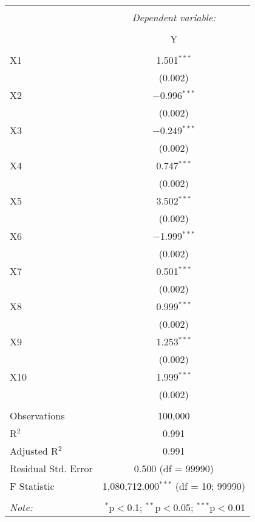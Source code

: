 \documentclass{article}
\begin{document}
\begin{table}[!htbp] \centering
  \caption{}
  \label{}
\begin{tabular}{@{\extracolsep{5pt}}lc}
\\[-1.8ex]\hline
\hline \\[-1.8ex]
 & \multicolumn{1}{c}{\textit{Dependent variable:}} \\
\cline{2-2}
\\[-1.8ex] & Y \\
\hline \\[-1.8ex]
 X1 & 1.501$^{***}$ \\
  & (0.002) \\
 X2 & $-$0.996$^{***}$ \\
  & (0.002) \\
 X3 & $-$0.249$^{***}$ \\
  & (0.002) \\
 X4 & 0.747$^{***}$ \\
  & (0.002) \\
 X5 & 3.502$^{***}$ \\
  & (0.002) \\
 X6 & $-$1.999$^{***}$ \\
  & (0.002) \\
 X7 & 0.501$^{***}$ \\
  & (0.002) \\
 X8 & 0.999$^{***}$ \\
  & (0.002) \\
 X9 & 1.253$^{***}$ \\
  & (0.002) \\
 X10 & 1.999$^{***}$ \\
  & (0.002) \\

\hline \\[-1.8ex]
Observations & 100,000 \\
R$^{2}$ & 0.991 \\
Adjusted R$^{2}$ & 0.991 \\
Residual Std. Error & 0.500 (df = 99990) \\
F Statistic & 1,080,712.000$^{***}$ (df = 10; 99990) \\
\hline
\hline \\[-1.8ex]
\textit{Note:}  & \multicolumn{1}{r}{$^{*}$p$<$0.1; $^{**}$p$<$0.05; $^{***}$p$<$0.01} \\


\end{tabular}
\end{table}
\end{document}
